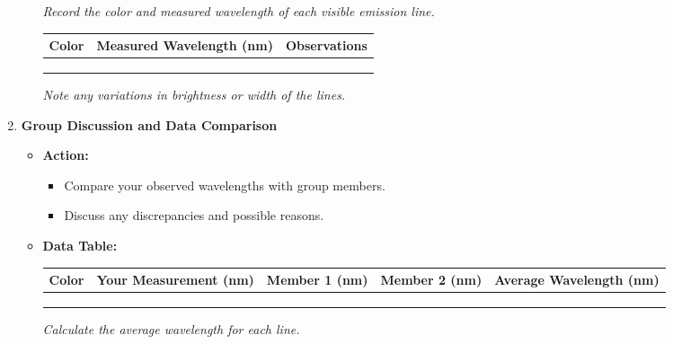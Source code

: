 \documentclass{article}
\begin{document}
\begin{enumerate}
\begin{itemize}
        \textit{Record the color and measured wavelength of each visible emission line.}
        
        \begin{center}
        \renewcommand{\arraystretch}{1.5}
        \begin{tabular}{|p{3cm}|p{4cm}|p{6cm}|}
        \hline
        \textbf{Color} & \textbf{Measured Wavelength (nm)} & \textbf{Observations} \\ \hline
        & & \\ \hline
        & & \\ \hline
        & & \\ \hline
        \end{tabular}
        \end{center}
        
        \textit{Note any variations in brightness or width of the lines.}
        
    \end{itemize}
    
    \item \textbf{Group Discussion and Data Comparison}
    
    \begin{itemize}
        \item \textbf{Action:}
        \begin{itemize}
            \item Compare your observed wavelengths with group members.
            \item Discuss any discrepancies and possible reasons.
        \end{itemize}
        \item \textbf{Data Table:}
        
        \begin{center}
        \renewcommand{\arraystretch}{1.5}
        \begin{tabular}{|p{3cm}|p{3cm}|p{3cm}|p{3cm}|p{3cm}|}
        \hline
        \textbf{Color} & \textbf{Your Measurement (nm)} & \textbf{Member 1 (nm)} & \textbf{Member 2 (nm)} & \textbf{Average Wavelength (nm)} \\ \hline
        & & & & \\ \hline
        & & & & \\ \hline
        & & & & \\ \hline
        \end{tabular}
        \end{center}
        
        \textit{Calculate the average wavelength for each line.}
    \end{itemize}
    

\end{enumerate}
\end{document}
